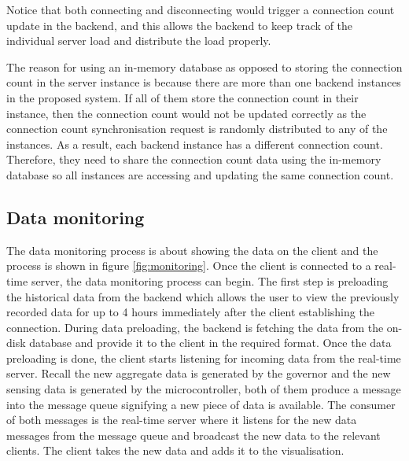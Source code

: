 \documentclass[../thesis.tex]{subfiles}
\begin{document}
Notice that both connecting and disconnecting would trigger a connection count update in the backend, and this allows the backend to keep track of the individual server load and distribute the load properly.

The reason for using an in-memory database as opposed to storing the connection count in the server instance is because there are more than one backend instances in the proposed system. If all of them store the connection count in their instance, then the connection count would not be updated correctly as the connection count synchronisation request is randomly distributed to any of the instances. As a result, each backend instance has a different connection count. Therefore, they need to share the connection count data using the in-memory database so all instances are accessing and updating the same connection count.

\subsection{Data monitoring}

The data monitoring process is about showing the data on the client and the process is shown in figure \ref{fig:monitoring}. Once the client is connected to a real-time server, the data monitoring process can begin. The first step is preloading the historical data from the backend which allows the user to view the previously recorded data for up to 4 hours immediately after the client establishing the connection. During data preloading, the backend is fetching the data from the on-disk database and provide it to the client in the required format. Once the data preloading is done, the client starts listening for incoming data from the real-time server. Recall the new aggregate data is generated by the governor and the new sensing data is generated by the microcontroller, both of them produce a message into the message queue signifying a new piece of data is available. The consumer of both messages is the real-time server where it listens for the new data messages from the message queue and broadcast the new data to the relevant clients. The client takes the new data and adds it to the visualisation.
\end{document}
